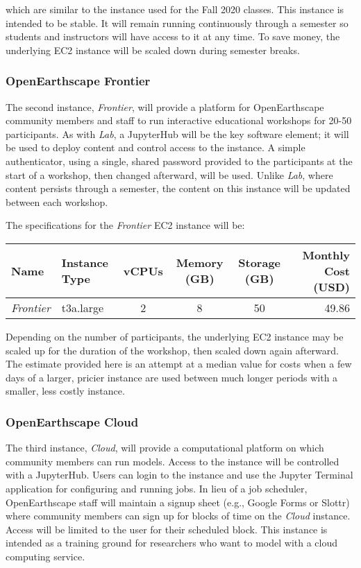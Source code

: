 \noindent
which are similar to the instance used for the Fall 2020 classes.
This instance is intended to be stable.
It will remain running continuously through a semester so students and instructors will have access to it at any time.
To save money, the underlying EC2 instance will be scaled down during semester breaks.

\subsubsection*{OpenEarthscape Frontier}

The second instance, \textit{Frontier}, will provide a platform for OpenEarthscape community members and staff to run interactive educational workshops for 20-50 participants.
As with \textit{Lab}, a JupyterHub will be the key software element;
it will be used to deploy content and control access to the instance.
A simple authenticator, using a single, shared password provided to the participants at the start of a workshop, then changed afterward, will be used.
Unlike \textit{Lab}, where content persists through a semester, the content on this instance will be updated between each workshop.

The specifications for the \textit{Frontier} EC2 instance will be:

\begin{center}
\begin{tabular}{ |l|l|c|c|c|r| } 
 \hline
 Name & Instance Type & vCPUs & Memory (GB) & Storage (GB) & Monthly Cost (USD) \\ [0.5ex]
 \hline
 \textit{Frontier} & t3a.large & 2 & 8 & 50 & 49.86 \\ 
 \hline
\end{tabular}
\end{center}

\noindent
Depending on the number of participants, the underlying EC2 instance may be scaled up for the duration of the workshop, then scaled down again afterward.
The estimate provided here is an attempt at a median value for costs when a few days of a larger, pricier instance are used between much longer periods with a smaller, less costly instance.

\subsubsection*{OpenEarthscape Cloud}

The third instance, \textit{Cloud}, will provide a computational platform on which community members can run models.
Access to the instance will be controlled with a JupyterHub.
Users can login to the instance and use the Jupyter Terminal application for configuring and running jobs.
In lieu of a job scheduler, OpenEarthscape staff will maintain a signup sheet (e.g., Google Forms or Slottr) where community members can sign up for blocks of time on the \textit{Cloud} instance. Access will be limited to the user for their scheduled block.
This instance is intended as a training ground for researchers who want to model with a cloud computing service.


